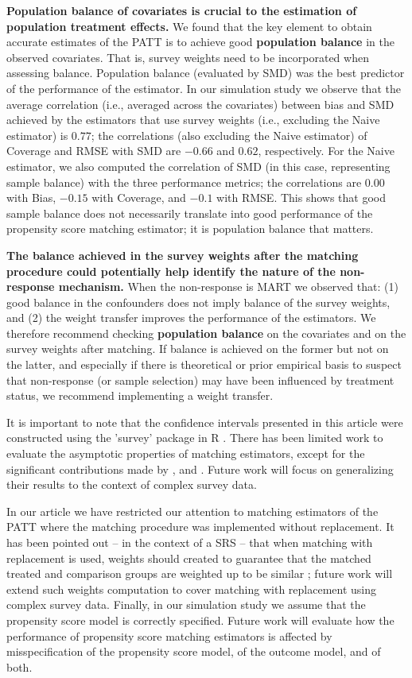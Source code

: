 \documentclass[oupdraft]{bio}
\begin{document}
\textbf{Population balance of covariates is crucial to the estimation of population treatment effects.} We found that the key element to obtain accurate estimates of the PATT is to achieve good \textbf{population balance} in the observed covariates. That is, survey weights need to be incorporated when assessing balance. Population balance (evaluated by SMD) was the best predictor of the performance of the estimator.  In our simulation study we observe that the average correlation (i.e., averaged across the covariates) between bias and SMD achieved by the estimators that use survey weights (i.e., excluding the Naive estimator) is $0.77$; the correlations (also excluding the Naive estimator) of Coverage and RMSE with SMD are $-0.66$ and $0.62$, respectively. For the Naive estimator, we also computed the correlation of SMD (in this case, representing sample balance) with the three performance metrics; the correlations are $0.00$ with Bias, $-0.15$ with Coverage, and $-0.1$ with RMSE. This shows that good sample balance does not necessarily translate into good performance of the propensity score matching estimator; it is population balance that matters. 

\textbf{The balance achieved in the survey weights after the matching procedure could potentially help identify the nature of the non-response mechanism.}
When the non-response is MART we observed that: (1) good balance in the confounders does not imply balance of the survey weights,  and (2) the weight transfer improves the performance of the estimators. We therefore recommend checking \textbf{population balance} on the covariates and on the survey weights after matching. If balance is achieved on the former but not on the latter, and especially if there is theoretical or prior empirical basis to suspect that non-response (or sample selection) may have been influenced by treatment status, we recommend implementing a weight transfer.

It is important to note that the confidence intervals presented in this article were constructed using the 'survey' package in R \citep{lumley2015survey}. There has been limited work to evaluate the asymptotic properties of matching estimators, except for the significant contributions made by \citet{abadie2006large}, \citet{abadie2008failure} and \citet{abadie2016matching}. Future work will focus on generalizing their results to the context of complex survey data. 

In our article we have restricted our attention to matching estimators of the PATT where the matching procedure was implemented without replacement. It has been pointed out -- in the context of a SRS -- that when matching with replacement is used, weights should created to guarantee that the matched treated
and comparison groups are weighted up to be similar \citep{ho2011matchit}; future work will extend such weights computation to cover matching with replacement using complex survey data.
Finally, in our simulation study we assume that the propensity score model is correctly specified. Future work will evaluate how the performance of propensity score matching estimators is affected by misspecification of the propensity score model, of the outcome model, and of both.
\end{document}
